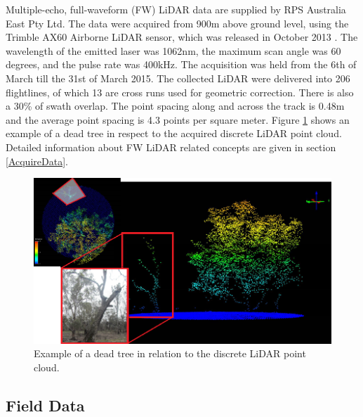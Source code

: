 \documentclass{subfiles}
\begin{document}
\par Multiple-echo, full-waveform (FW) LiDAR data are supplied by RPS Australia East Pty Ltd. The data were acquired from 900m above ground level, using the Trimble AX60 Airborne LiDAR sensor, which was released in October 2013 \cite{Trimble}. The wavelength of the emitted laser was 1062nm, the maximum scan angle was 60 degrees, and the pulse rate was 400kHz. The acquisition was held from the 6th of March till the 31st of March 2015.  The collected LiDAR were delivered into 206 flightlines, of which 13 are cross runs used for geometric correction. There is also a 30\% of swath overlap. The point spacing along and across the track  is 0.48m and the average point spacing is 4.3 points per square meter. Figure \ref{fig:DeadTreeInLiDAR} shows an example of a dead tree in respect to the acquired discrete LiDAR point cloud.   Detailed information about FW LiDAR related concepts are given in section \ref{AcquireData}.



 \begin{figure} [h!]
 	\centering
 	\includegraphics[width=\textwidth]{img/dead/DeadTreeInLiDAR}
 	\caption{Example of a dead tree in relation to the discrete LiDAR point cloud.}
 	\label{fig:DeadTreeInLiDAR}
 \end{figure}



\subsection{Field Data}\label{sec:fieldData}
\end{document}
